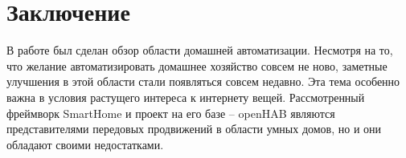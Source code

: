 \section{Заключение}

В работе был сделан обзор области домашней автоматизации.
Несмотря на то, что желание автоматизировать домашнее хозяйство совсем не ново, заметные улучшения в этой области стали появляться совсем недавно.
Эта тема особенно важна в условия растущего интереса к интернету вещей.
Рассмотренный фреймворк SmartHome и проект на его базе -- openHAB являются представителями передовых продвижений в области умных домов,
но и они обладают своими недостатками.
